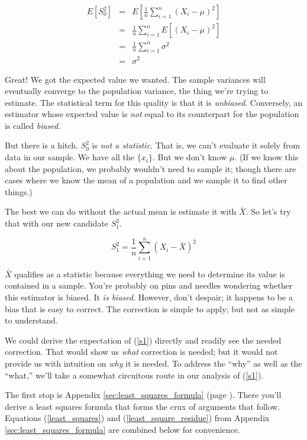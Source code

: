 \documentclass[]{article}
\begin{document}
\begin{eqnarray}
E\left[ S_0^2 \right] &= &E \left[ \frac{1}{n} \sum_{i=1}^n 
         (X_i - \mu)^2\right] \nonumber \\
  &= &\frac{1}{n} \sum_{i=1}^n E \left[ (X_i - \mu)^2 \right] \nonumber \\
  &= &\frac{1}{n} \sum_{i=1}^n \sigma^2 \nonumber \\ 
  &= &\sigma^2  \nonumber
\end{eqnarray}

Great!  We got the expected value we wanted.  The sample variances
will eventually converge to the population variance, the thing
we're trying to estimate.  The statistical term for this quality
is that it is \emph{unbiased}.  Conversely, an estimator whose
expected value is \emph{not} equal to its counterpart for the
population is called \emph{biased}.

But there is a hitch.
$S_0^2$ is \emph{not a statistic}.  That is, we can't evaluate it
solely from data in our sample.  We have all the $\{x_i\}$.  But
we don't know $\mu$.  (If we know this about the population,
we probably wouldn't need to sample it; though there are cases
where we know the mean of a population and we sample it to find
other things.)

The best we can do without the actual mean is estimate it with
$\bar{X}$.  So let's try that with our new candidate $S_1^2$.

\begin{equation} \label{s1}
S_1^2 = \frac{1}{n} \sum_{i=1}^n (X_i - \bar{X})^2
\end{equation}

$\bar{X}$ qualifies as a statistic because everything we
need to determine its value is contained in a sample.
You're probably on pins and needles wondering whether this
estimator is biased.  It \emph{is biased}.  However, don't
despair; it happens to be a bias that is easy to correct.
The correction is simple to apply; but not as simple to
understand.

We could derive the expectation of (\ref{s1}) directly
and readily see the needed correction.  That would
show us \emph{what} correction is needed; but it would
not provide us with intuition on \emph{why} it is needed.
To address the ``why'' as well as the ``what,'' we'll
take a somewhat circuitous route in our analysis of
(\ref{s1}).

The first stop is Appendix \ref{sec:least_squares_formula}
(page \pageref{sec:least_squares_formula}).
There you'll derive a least squares formula that forms
the crux of arguments that follow.  Equations
(\ref{least_squares}) and
(\ref{least_square_residue}) from 
Appendix \ref{sec:least_squares_formula}
are combined below for convenience.
\end{document}
